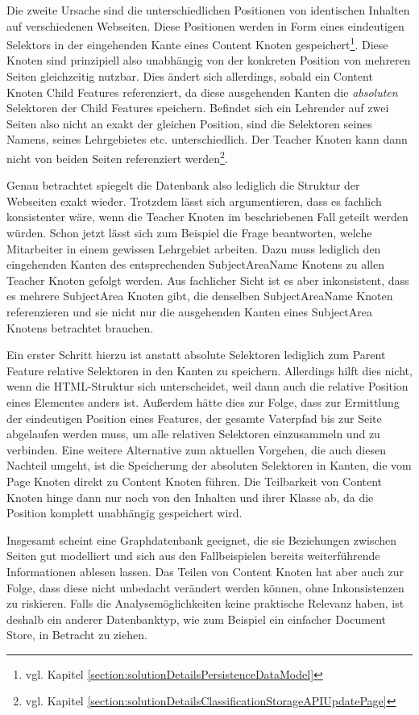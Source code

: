     Die zweite Ursache sind die unterschiedlichen Positionen von identischen Inhalten
    auf verschiedenen Webseiten.
    Diese Positionen werden in Form eines eindeutigen Selektors in der eingehenden
    Kante eines Content Knoten gespeichert\footnote{vgl. Kapitel \ref{section:solutionDetailsPersistenceDataModel}}.
    Diese Knoten sind prinzipiell also unabhängig von der konkreten Position
    von mehreren Seiten gleichzeitig nutzbar.
    Dies ändert sich allerdings, sobald ein Content Knoten Child Features referenziert,
    da diese ausgehenden Kanten die \textit{absoluten} Selektoren der Child Features speichern.
    Befindet sich ein Lehrender auf zwei Seiten also nicht an exakt der gleichen Position,
    sind die Selektoren seines Namens, seines Lehrgebietes etc. unterschiedlich.
    Der Teacher Knoten kann dann nicht von beiden Seiten referenziert
    werden\footnote{vgl. Kapitel \ref{section:solutionDetailsClassificationStorageAPIUpdatePage}}.
    
    Genau betrachtet spiegelt die Datenbank also lediglich die Struktur der Webseiten exakt wieder.
    Trotzdem lässt sich argumentieren, dass es fachlich konsistenter wäre,
    wenn die Teacher Knoten im beschriebenen Fall geteilt werden würden.
    Schon jetzt lässt sich zum Beispiel die Frage beantworten,
    welche Mitarbeiter in einem gewissen Lehrgebiet arbeiten.
    Dazu muss lediglich den eingehenden Kanten des entsprechenden
    SubjectAreaName Knotens zu allen Teacher Knoten gefolgt werden.
    Aus fachlicher Sicht ist es aber inkonsistent,
    dass es mehrere SubjectArea Knoten gibt,
    die denselben SubjectAreaName Knoten referenzieren und sie nicht
    nur die ausgehenden Kanten eines SubjectArea Knotens betrachtet brauchen.    

    Ein erster Schritt hierzu ist anstatt absolute Selektoren
    lediglich zum Parent Feature relative Selektoren in den Kanten zu speichern.
    Allerdings hilft dies nicht, wenn die HTML-Struktur sich unterscheidet,
    weil dann auch die relative Position eines Elementes anders ist.
    Außerdem hätte dies zur Folge, dass zur Ermittlung der eindeutigen Position
    eines Features, der gesamte Vaterpfad bis zur Seite abgelaufen werden muss,
    um alle relativen Selektoren einzusammeln und zu verbinden.
    Eine weitere Alternative zum aktuellen Vorgehen,
    die auch diesen Nachteil umgeht,
    ist die Speicherung der absoluten Selektoren in Kanten,
    die vom Page Knoten direkt zu Content Knoten führen.
    Die Teilbarkeit von Content Knoten hinge dann nur noch von den Inhalten und ihrer Klasse ab,
    da die Position komplett unabhängig gespeichert wird.

    Insgesamt scheint eine Graphdatenbank geeignet,
    die sie Beziehungen zwischen Seiten gut modelliert
    und sich aus den Fallbeispielen bereits weiterführende Informationen ablesen lassen.
    Das Teilen von Content Knoten hat aber auch zur Folge,
    dass diese nicht unbedacht verändert werden können,
    ohne Inkonsistenzen zu riskieren.
    Falls die Analysemöglichkeiten keine praktische Relevanz haben,
    ist deshalb ein anderer Datenbanktyp, wie zum Beispiel ein einfacher Document Store,
    in Betracht zu ziehen.